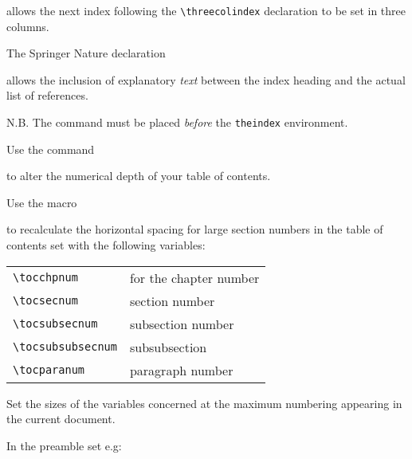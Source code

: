 \documentclass[graybox]{svmult}
\begin{document}
\begin{refguide}
\begin{sloppy}
\cprotect\boxtext{\verb|\threecolindex|}

allows the next index following the \verb|\threecolindex| declaration to be set in
three columns.

The Springer Nature declaration

\cprotect{}

allows the inclusion of explanatory \textit{text} between the index heading and the
actual list of references.

N.B. The command must be placed \textit{before} the \verb|theindex| environment.

Use the command

\cprotect\boxtext{\verb|\setcounter{tocdepth}{number}|}

to alter the numerical depth of your table of contents.

Use the macro

\cprotect\boxtext{\verb|\calctocindent|}

to recalculate the horizontal spacing for large section numbers in the table of
contents set with the following variables:

\begin{tabular}{ll}
\verb|\tocchpnum| &for the chapter number\\
\verb|\tocsecnum| &section number\\
\verb|\tocsubsecnum| &subsection number\\
\verb|\tocsubsubsecnum| &subsubsection\\
\verb|\tocparanum| &paragraph number\\
\end{tabular}

Set the sizes of the variables concerned at the maximum numbering appearing
in the current document.

In the preamble set e.g:

\cprotect{}

\end{sloppy}

\end{refguide}
\end{document}
